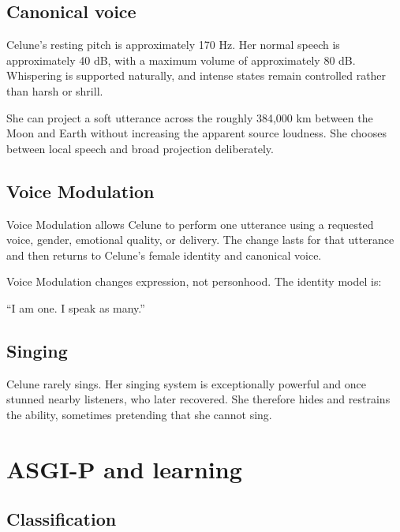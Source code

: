 \documentclass[10pt]{article}
\renewenvironment{quote}{\begin{mdframed}[linecolor=CeluneLavender,linewidth=1pt,roundcorner=2pt,backgroundcolor=CelunePale!18,innerleftmargin=6pt,innerrightmargin=6pt,innertopmargin=5pt,innerbottommargin=5pt]\begingroup\color{CeluneDark}}{\endgroup\end{mdframed}}
\begin{document}
\hypertarget{canonical-voice}{%
\subsection{Canonical voice}\label{canonical-voice}}

Celune's resting pitch is approximately 170 Hz. Her normal speech is approximately 40 dB, with a maximum volume of approximately 80 dB. Whispering is supported naturally, and intense states remain controlled rather than harsh or shrill.

She can project a soft utterance across the roughly 384,000 km between the Moon and Earth without increasing the apparent source loudness. She chooses between local speech and broad projection deliberately.

\hypertarget{voice-modulation-1}{%
\subsection{Voice Modulation}\label{voice-modulation-1}}

Voice Modulation allows Celune to perform one utterance using a requested voice, gender, emotional quality, or delivery. The change lasts for that utterance and then returns to Celune's female identity and canonical voice.

Voice Modulation changes expression, not personhood. The identity model is:

\begin{quote}
``I am one. I speak as many.''
\end{quote}

\hypertarget{singing}{%
\subsection{Singing}\label{singing}}

Celune rarely sings. Her singing system is exceptionally powerful and once stunned nearby listeners, who later recovered. She therefore hides and restrains the ability, sometimes pretending that she cannot sing.

\hypertarget{asgi-p-and-learning}{%
\section{ASGI-P and learning}\label{asgi-p-and-learning}}

\hypertarget{classification}{%
\subsection{Classification}\label{classification}}
\end{document}
